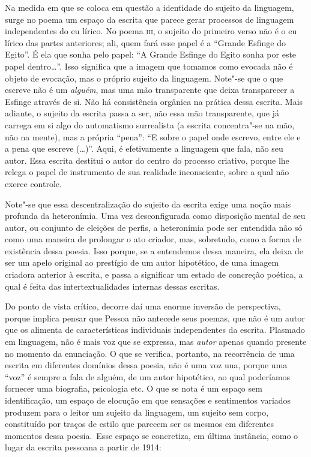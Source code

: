 Na medida em que se coloca em questão a identidade do sujeito da
linguagem, surge no poema um espaço da escrita que parece gerar
processos de linguagem independentes do eu lírico. No poema
\textsc{iii}, o sujeito do primeiro verso não é o eu lírico das partes
anteriores; ali, quem fará esse papel é a ``Grande Esfinge do Egito''. É
ela que sonha pelo papel: ``A Grande Esfinge do Egito sonha por este
papel dentro\ldots{}''. Isso significa que a imagem que tomamos como evocada
não é objeto de evocação, mas o próprio sujeito da linguagem. Note"-se
que o que escreve não é um \emph{alguém}, mas uma mão transparente que
deixa transparecer a Esfinge através de si. Não há consistência orgânica
na prática dessa escrita. Mais adiante, o sujeito da escrita passa a ser,
não essa mão transparente, que já carrega em si algo do automatismo
surrealista (a escrita concentra"-se na mão, não na mente), mas a própria
``pena'': ``E sobre o papel onde escrevo, entre ele e a pena que escreve
(\ldots{})''. Aqui, é efetivamente a linguagem que fala, não seu autor. Essa
escrita destitui o autor do centro do processo criativo, porque lhe
relega o papel de instrumento de sua realidade inconsciente, sobre a
qual não exerce controle.

Note"-se que essa descentralização do sujeito da escrita exige uma noção
mais profunda da heteronímia. Uma vez desconfigurada como disposição
mental de seu autor, ou conjunto de eleições de perfis, a heteronímia
pode ser entendida não só como uma maneira de prolongar o ato criador,
mas, sobretudo, como a forma de existência dessa poesia. Isso porque, se
a entendemos dessa maneira, ela deixa de ser um apelo original ao
prestígio de um autor hipotético, de uma imagem criadora anterior à
escrita, e passa a significar um estado de concreção poética, a qual é
feita das intertextualidades internas dessas escritas.

Do ponto de vista crítico, decorre daí uma enorme inversão de
perspectiva, porque implica pensar que Pessoa não antecede seus poemas,
que não é um autor que os alimenta de características individuais
independentes da escrita. Plasmado em linguagem, não é mais voz que se
expressa, mas \emph{autor} apenas quando presente no momento da
enunciação. O que se verifica, portanto, na recorrência de uma escrita
em diferentes domínios dessa poesia, não é uma voz una, porque uma
``voz'' é sempre a fala de alguém, de um autor hipotético, ao qual
poderíamos fornecer uma biografia, psicologia etc. O que se nota é um
espaço sem identificação, um espaço de elocução em que sensações e
sentimentos variados produzem para o leitor um sujeito da linguagem, um
sujeito sem corpo, constituído por traços de estilo que parecem ser os
mesmos em diferentes momentos dessa poesia.~Esse espaço se concretiza,
em última instância, como o lugar da escrita pessoana a partir de 1914:

